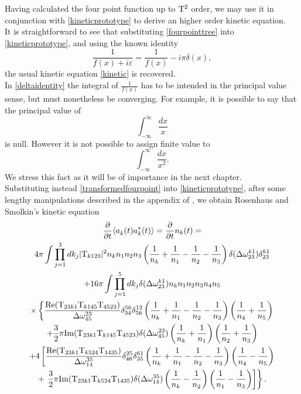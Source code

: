Having calculated the four point function up to $\mathrm{T}^2$ order, we may use it in conjunction with \eqref{kineticprototype} to derive an higher order kinetic equation.\\
It is straightforward to see that substituting \eqref{fourpointtree} into \eqref{kineticprototype}, and using the known identity
\begin{equation}
    \frac{1}{f(x) + i\varepsilon} = \frac{1}{f(x)} -i\pi\delta(x),
    \label{deltaidentity}
\end{equation}
the usual kinetic equation \eqref{kinetic} is recovered. \\
In \eqref{deltaidentity} the integral of $\frac{1}{f(x)}$ has to be intended in the principal value sense, but must nonetheless be converging. For example, it is possible to say that the principal value 
of 
\begin{equation}
    \int_{-\infty}^{\infty}\frac{dx}{x}
\end{equation} 
is null. However it is not possible to assign finite value to 
\begin{equation}
    \int_{-\infty}^{\infty} \frac{dx}{x^2}.
\end{equation}
We stress this fact as it will be of importance in the next chapter. \\
Substituting instead \eqref{transformedfourpoint} into \eqref{kineticprototype}, after some lengthy manipulations described in the appendix of \cite{Rosenhaus2023},
we obtain Rosenhaus and Smolkin's kinetic equation 
\begin{multline}
        \frac{\partial}{\partial t} \langle a_k^{}(t) a_k^*(t) \rangle = \frac{\partial}{\partial t} n_k(t) = \\4\pi \int \prod_{j=1}^{3} dk_j|\mathrm{T}_{k123}|^2n_kn_1n_2n_3\left(\frac{1}{n_k} +\frac{1}{n_1}-
        \frac{1}{n_2}-\frac{1}{n_3}\right)\delta(\Delta{\omega}^{k1}_{23})\delta^{k1}_{23} \\
          + 16\pi\int \prod_{j=1}^{5} dk_j\delta(\Delta{\omega}^{k1}_{23})n_kn_1n_2n_3n_4n_5 \\
          \times \left\{  \dfrac{\text{Re}(\mathrm{T}_{23k1}\mathrm{T}_{k145}\mathrm{T}_{4523})}{\Delta{\omega}^{23}_{45}}\delta^{56}_{34}\delta^{12}_{56}
          \left(\frac{1}{n_k} +\frac{1}{n_1} -\frac{1}{n_2} - \frac{1}{n_3}\right)\left(\frac{1}{n_4}+\frac{1}{n_5}\right)  \right. \\
          + \frac{3}{2}\pi\text{Im}(\mathrm{T}_{23k1}\mathrm{T}_{k145}\mathrm{T}_{4523})\delta(\Delta{\omega}^{23}_{45})\left(\frac{1}{n_k}+\frac{1}{n_1}\right)\left(\frac{1}{n_2}
          +\frac{1}{n_3}\right) \\
            + 4\left[\dfrac{\text{Re}(\mathrm{T}_{23k1}\mathrm{T}_{k524}\mathrm{T}_{1435})}{\Delta{\omega}^{35}_{14}}\delta^{25}_{46}\delta^{61}_{35}
            \left(\frac{1}{n_k} +\frac{1}{n_1} -\frac{1}{n_2} - \frac{1}{n_3}\right)\left(\frac{1}{n_4}-\frac{1}{n_5}\right)\right. \\
            + \left. \left. \frac{3}{2}\pi\text{Im}(\mathrm{T}_{23k1}\mathrm{T}_{k524}\mathrm{T}_{1435})\delta(\Delta{\omega}^{35}_{14})\left(\frac{1}{n_k}-
            \frac{1}{n_2}\right)\left(\frac{1}{n_1}-\frac{1}{n_3}\right)  \right]\right\}.
            \label{NLOkinetic}
\end{multline}
